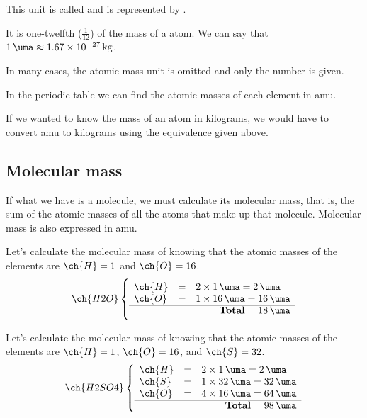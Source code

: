 This unit is called  and is represented by \unit{\uma}.

\begin{definition}
    It is one-twelfth (\( \frac{1}{12} \)) of the mass of a  atom. We can say that \( \qty{1}{\uma} \approx \qty{1.67e-27}{\kilogram} \).
\end{definition}

In many cases, the atomic mass unit is omitted and only the number is given.

In the periodic table we can find the atomic masses of each element in amu.

If we wanted to know the mass of an atom in kilograms, we would have to convert amu to kilograms using the equivalence given above.

\subsection{Molecular mass}

If what we have is a molecule, we must calculate its molecular mass, that is, the sum of the atomic masses of all the atoms that make up that molecule. Molecular mass is also expressed in amu.

\begin{example}{}
    Let's calculate the molecular mass of  knowing that the atomic masses of the elements are \( \ch{H} = 1 \) and \( \ch{O} = 16 \).
    \[
        \ch{H2O} \left\{\rule{0pt}{0.8cm}
                     \begin{array}{lcl}
                         \ch{H} &=& 2 \times \qty{1}{\uma} = \qty{2}{\uma} \\
                         \ch{O} &=& 1 \times \qty{16}{\uma} = \qty{16}{\uma} \\
                         \cline{1-3}
                         \multicolumn{3}{r}{\textbf{Total} = \qty{18}{\uma}}
                     \end{array}
        \right.
    \]
\end{example}

\begin{example}{}
    Let's calculate the molecular mass of  knowing that the atomic masses of the elements are \( \ch{H} = 1 \), \( \ch{O} = 16 \), and \( \ch{S} = 32 \).
    \[
        \ch{H2SO4} \left\{\rule{0pt}{0.8cm}
                       \begin{array}{lcl}
                           \ch{H} &=& 2 \times \qty{1}{\uma} = \qty{2}{\uma} \\
                           \ch{S} &=& 1 \times \qty{32}{\uma} = \qty{32}{\uma} \\
                           \ch{O} &=& 4 \times \qty{16}{\uma} = \qty{64}{\uma} \\
                           \cline{1-3}
                           \multicolumn{3}{r}{\textbf{Total} = \qty{98}{\uma}}
                       \end{array}
        \right.
    \]
\end{example}



